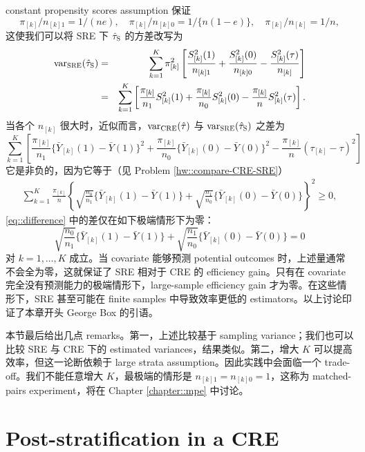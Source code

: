 constant propensity scores assumption 保证
$$ 
\pi_{[k]} / n_{[k]1}  = 1/(ne), \quad   \pi_{[k]} / n_{[k]0} = 1/\{n(1-e) \},\quad \pi_{[k]} / n_{[k]} = 1/n,
$$
这使我们可以将 SRE 下 $\hat{\tau}_\textsc{S}$ 的方差改写为
\begin{eqnarray*}
\textup{var}_\textsc{SRE}(\hat{\tau}_\textsc{S}) &= & \sum_{k=1}^K  \pi_{[k]}^2 \left[ \frac{S_{[k]}^2(1)}{ n_{[k]1} } +  \frac{S_{[k]}^2(0)}{ n_{[k]0} }
- \frac{  S_{[k]}^2(\tau) }{ n_{[k]} } \right]\\
&=&\sum_{k=1}^K  \left[   \frac{ \pi_{[k]}}{n_1}  S_{[k]}^2(1) + \frac{ \pi_{[k]}}{n_0}  S_{[k]}^2(0) -  \frac{ \pi_{[k]}}{n}    S_{[k]}^2(\tau) \right] .
\end{eqnarray*}
 当各个 $n_{[k]}$ 很大时，近似而言，$\textup{var}_{\text{CRE}}(  \hat{\tau} )$ 与 $\textup{var}_\textsc{SRE}(\hat{\tau}_\textsc{S})$ 之差为
$$
\sum_{k=1}^K  \left[    \frac{ \pi_{[k]}}{n_1}  \{ \bar{Y}_{[k]}(1) - \bar{Y}(1) \}^2 +  \frac{ \pi_{[k]}}{n_0}  \{ \bar{Y}_{[k]}(0) - \bar{Y}(0) \}^2  
 - \frac{  \pi_{[k]}  }{n}  ( \tau_{[k]} - \tau  ) ^2  \right] 
 $$
 它是非负的，因为它等于（见 Problem \ref{hw::compare-CRE-SRE}）
 \begin{eqnarray}
\label{eq::difference}
\sum_{k=1}^K\frac{ \pi_{[k]}}{n} 
 \left\{
\sqrt{ \frac{n_0}{n_1} } \{ \bar{Y}_{[k]}(1) - \bar{Y}(1) \} +  \sqrt{ \frac{n_1}{n_0} } \{ \bar{Y}_{[k]}(0) - \bar{Y}(0) \}
 \right\}^2 \geq 0,
\end{eqnarray} 
\eqref{eq::difference} 中的差仅在如下极端情形下为零：
$$
\sqrt{ \frac{n_0}{n_1} } \{ \bar{Y}_{[k]}(1) - \bar{Y}(1) \} +  \sqrt{ \frac{n_1}{n_0} } \{ \bar{Y}_{[k]}(0) - \bar{Y}(0) \}
= 0 
$$
对 $k=1,\ldots, K$ 成立。当 covariate 能够预测 potential outcomes 时，上述量通常不会全为零，这就保证了 SRE 相对于 CRE 的 efficiency gain。只有在 covariate 完全没有预测能力的极端情形下，large-sample efficiency gain 才为零。在这些情形下，SRE 甚至可能在 finite samples 中导致效率更低的 estimators。以上讨论印证了本章开头 George Box 的引语。

 


本节最后给出几点 remarks。第一，上述比较基于 sampling variance；我们也可以比较 SRE 与 CRE 下的 estimated variances，结果类似。第二，增大 $K$ 可以提高效率，但这一论断依赖于 large strata assumption。因此实践中会面临一个 trade-off。我们不能任意增大 $K$，最极端的情形是 $n_{[k]1} = n_{[k]0} = 1$，这称为 matched-pairs experiment，将在 Chapter \ref{chapter::mpe} 中讨论。

 




\section{Post-stratification in a CRE}\label{sec::poststra-cre}

